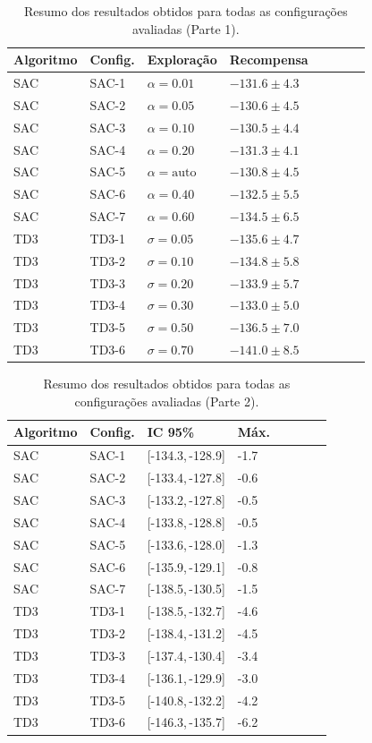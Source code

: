 \documentclass{Supervised_Reinforcement_Learningqsport}
\begin{document}
\begin{table}[H]
\centering
\scriptsize
\caption{Resumo dos resultados obtidos para todas as configurações avaliadas (Parte 1).}
\label{tab:consolidated_results_pt1}
\begin{tabular}{llllllll}
\toprule
Algoritmo & Config. & Exploração & Recompensa \\
\midrule
SAC & SAC-1 & $\alpha=0.01$ & $-131.6 \pm 4.3$ \\
SAC & SAC-2 & $\alpha=0.05$ & $-130.6 \pm 4.5$ \\
SAC & SAC-3 & $\alpha=0.10$ & $-130.5 \pm 4.4$ \\
SAC & SAC-4 & $\alpha=0.20$ & $-131.3 \pm 4.1$ \\
SAC & SAC-5 & $\alpha=\mathrm{auto}$ & $-130.8 \pm 4.5$ \\
SAC & SAC-6 & $\alpha=0.40$ & $-132.5 \pm 5.5$ \\
SAC & SAC-7 & $\alpha=0.60$ & $-134.5 \pm 6.5$ \\
TD3 & TD3-1 & $\sigma=0.05$ & $-135.6 \pm 4.7$ \\
TD3 & TD3-2 & $\sigma=0.10$ & $-134.8 \pm 5.8$ \\
TD3 & TD3-3 & $\sigma=0.20$ & $-133.9 \pm 5.7$ \\
TD3 & TD3-4 & $\sigma=0.30$ & $-133.0 \pm 5.0$ \\
TD3 & TD3-5 & $\sigma=0.50$ & $-136.5 \pm 7.0$ \\
TD3 & TD3-6 & $\sigma=0.70$ & $-141.0 \pm 8.5$ \\
\bottomrule
\end{tabular}
\end{table}

\begin{table}[H]
\centering
\scriptsize
\caption{Resumo dos resultados obtidos para todas as configurações avaliadas (Parte 2).}
\label{tab:consolidated_results_pt2}
\begin{tabular}{llllllll}
\toprule
Algoritmo & Config. & IC 95\% & Máx. \\
\midrule
SAC & SAC-1 & [-134.3,\,-128.9] & -1.7 \\
SAC & SAC-2 & [-133.4,\,-127.8] & -0.6 \\
SAC & SAC-3 & [-133.2,\,-127.8] & -0.5 \\
SAC & SAC-4 & [-133.8,\,-128.8] & -0.5 \\
SAC & SAC-5 & [-133.6,\,-128.0] & -1.3 \\
SAC & SAC-6 & [-135.9,\,-129.1] & -0.8 \\
SAC & SAC-7 & [-138.5,\,-130.5] & -1.5 \\
TD3 & TD3-1 & [-138.5,\,-132.7] & -4.6 \\
TD3 & TD3-2 & [-138.4,\,-131.2] & -4.5 \\
TD3 & TD3-3 & [-137.4,\,-130.4] & -3.4 \\
TD3 & TD3-4 & [-136.1,\,-129.9] & -3.0 \\
TD3 & TD3-5 & [-140.8,\,-132.2] & -4.2 \\
TD3 & TD3-6 & [-146.3,\,-135.7] & -6.2 \\
\bottomrule
\end{tabular}
\end{table}
\end{document}
